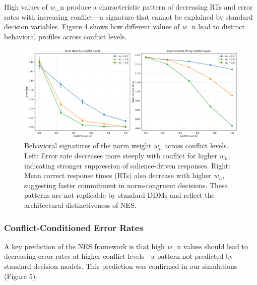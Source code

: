 \documentclass[
  11pt,
]{article}
\begin{document}
High values of \emph{w}\_n produce a characteristic pattern of
decreasing RTs and error rates with increasing conflict---a signature
that cannot be explained by standard decision variables. Figure 4 shows
how different values of \emph{w}\_n lead to distinct behavioral profiles
across conflict levels.

\begin{figure}
\centering
\includegraphics[width=0.8\linewidth,height=\textheight,keepaspectratio]{figures/wn_behavioral_signature.png}
\caption{Behavioral signatures of the norm weight \(w_n\) across
conflict levels. Left: Error rate decreases more steeply with conflict
for higher \(w_n\), indicating stronger suppression of salience-driven
responses. Right: Mean correct response times (RTs) also decrease with
higher \(w_n\), suggesting faster commitment in norm-congruent
decisions. These patterns are not replicable by standard DDMs and
reflect the architectural distinctiveness of
NES.}\label{fig:wn_signature}
\end{figure}

\subsubsection{Conflict-Conditioned Error
Rates}\label{conflict-conditioned-error-rates}

A key prediction of the NES framework is that high \emph{w}\_n values
should lead to decreasing error rates at higher conflict levels---a
pattern not predicted by standard decision models. This prediction was
confirmed in our simulations (Figure 5).
\end{document}
